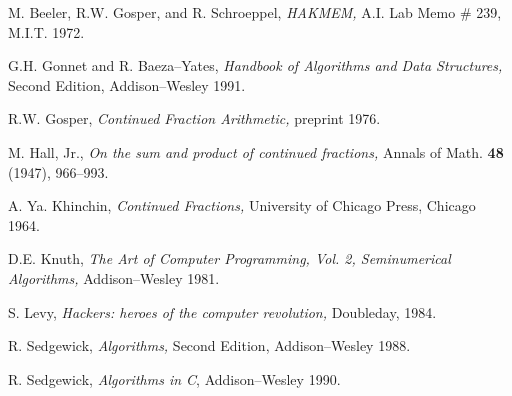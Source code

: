 \begin{thebibliography}{xxxxx}

M. Beeler, R.W. Gosper, and R. Schroeppel, {\sl  HAKMEM,} 
 A.I. Lab Memo \# 239, M.I.T. 1972. 

G.H. Gonnet and R. Baeza--Yates, {\sl Handbook of Algorithms and 
Data Structures,} Second Edition, Addison--Wesley 1991. 

R.W. Gosper, {\sl Continued Fraction Arithmetic,} preprint 1976.

M. Hall, Jr., {\sl On the sum and product of continued fractions,}
Annals of Math. {\bf 48} (1947), 966--993.

A. Ya. Khinchin, {\sl Continued Fractions,} University of Chicago Press,
Chicago 1964.

D.E. Knuth, {\sl The Art of Computer Programming, Vol. 2, Seminumerical
Algorithms,} Addison--Wesley 1981.

S. Levy, {\sl Hackers: heroes of the computer revolution,} Doubleday, 1984.

R. Sedgewick, {\sl Algorithms,} Second Edition, Addison--Wesley 1988.

R. Sedgewick, {\sl Algorithms in C}, Addison--Wesley 1990.

\end{thebibliography}



